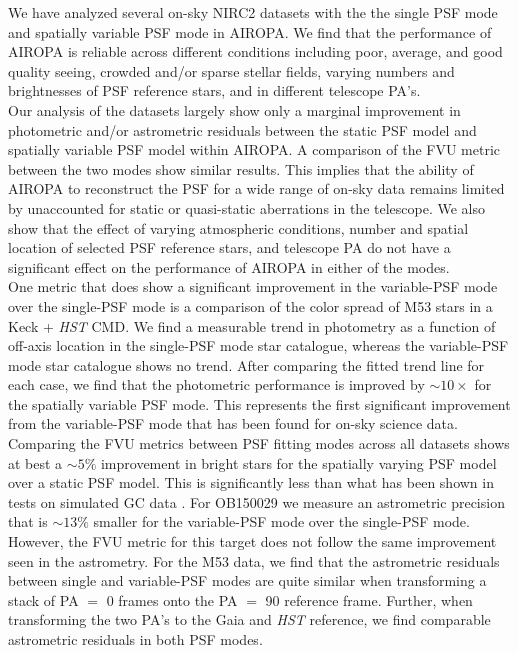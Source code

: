 \documentclass[]{spie}  %
\begin{document}
\indent We have analyzed several on-sky NIRC2 datasets with the the single PSF mode and spatially variable PSF mode in AIROPA. We find that the performance of AIROPA is reliable across different conditions including poor, average, and good quality seeing, crowded and/or sparse stellar fields, varying numbers and brightnesses of PSF reference stars, and in different telescope PA's.
\\
\indent Our analysis of the datasets largely show only a marginal improvement in photometric and/or astrometric residuals between the static PSF model and spatially variable PSF model within AIROPA. A comparison of the FVU metric between the two modes show similar results. This implies that the ability of AIROPA to reconstruct the PSF for a wide range of on-sky data remains limited by unaccounted for static or quasi-static aberrations in the telescope. We also show that the effect of varying atmospheric conditions, number and spatial location of selected PSF reference stars, and telescope PA do not have a significant effect on the performance of AIROPA in either of the modes.
\\
\indent One metric that does show a significant improvement in the variable-PSF mode over the single-PSF mode is a comparison of the color spread of M53 stars in a Keck + \textit{HST} CMD. We find a measurable trend in photometry as a function of off-axis location in the single-PSF mode star catalogue, whereas the variable-PSF mode star catalogue shows no trend. After comparing the fitted trend line for each case, we find that the photometric performance is improved by ${\sim}10\times$ for the spatially variable PSF mode. This represents the first significant improvement from the variable-PSF mode that has been found for on-sky science data.
\\
\indent Comparing the FVU metrics between PSF fitting modes across all datasets shows at best a ${\sim}5\%$ improvement in bright stars for the spatially varying PSF model over a static PSF model. This is significantly less than what has been shown in tests on simulated GC data \cite{Turri:inprep}. For OB150029 we measure an astrometric precision that is ${\sim}13\%$ smaller for the variable-PSF mode over the single-PSF mode. However, the FVU metric for this target does not follow the same improvement seen in the astrometry. For the M53 data, we find that the astrometric residuals between single and variable-PSF modes are quite similar when transforming a stack of PA $=$ 0 frames onto the PA $=$ 90 reference frame. Further, when transforming the two PA's to the Gaia and \textit{HST} reference, we find comparable astrometric residuals in both PSF modes.
\end{document}
